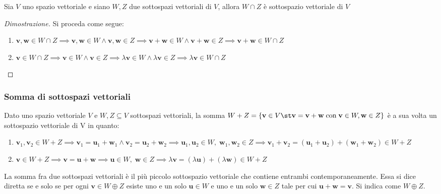     \vspace{10pt}
    \begin{lemma}
       Sia $V$ uno spazio vettoriale e siano $W, Z$ due sottospazi vettoriali di $V$, allora $W \cap Z$ è sottospazio vettoriale di $V$
    \end{lemma}
    \begin{proof}[Dimostrazione]
        Si proceda come segue:
        \begin{enumerate}[label=(\Roman*)]
            \item $\mathbf{v}, \mathbf{w} \in W \cap Z \implies \mathbf{v}, \mathbf{w} \in W \land \mathbf{v}, \mathbf{w} \in Z \implies \mathbf{v} + \mathbf{w} \in W \land \mathbf{v} + \mathbf{w} \in Z \implies \mathbf{v} + \mathbf{w} \in W \cap Z$
            \item $\mathbf{v} \in W \cap Z \implies \mathbf{v} \in W \land \mathbf{v} \in Z \implies \lambda \mathbf{v} \in W \land \lambda \mathbf{v} \in Z \implies \lambda \mathbf{v} \in W \cap Z$
        \end{enumerate}
    \end{proof}

    \subsubsection{Somma di sottospazi vettoriali} \label{subsubsec:vsdirect}
    Dato uno spazio vettoriale $V$ e $W, Z \subseteq V$ sottospazi vettoriali, la somma $W + Z = \{\mathbf{v} \in V \st \mathbf{v} = \mathbf{v} + \mathbf{w} \; \textnormal{con} \; \mathbf{v} \in W, \mathbf{w} \in Z\}$ è a sua volta un sottospazio vettoriale di V in quanto:
    \begin{enumerate}[label=(\arabic*)]
        \item $\mathbf{v}_{1}, \mathbf{v}_{2} \in W + Z \implies \mathbf{v}_{1} = \mathbf{u}_{1} + \mathbf{w}_{1} \land \mathbf{v}_{2} = \mathbf{u}_{2} + \mathbf{w}_{2} \implies \mathbf{u}_{1}, \mathbf{u}_{2} \in W, \; \mathbf{w}_{1}, \mathbf{w}_{2} \in Z \implies \mathbf{v}_{1} + \mathbf{v}_{2} = (\mathbf{u}_{1} + \mathbf{u}_{2}) + (\mathbf{w}_{1} + \mathbf{w}_{2}) \in W + Z$
        \item $\mathbf{v} \in W + Z \implies \mathbf{v} = \mathbf{u} + \mathbf{w} \implies \mathbf{u} \in W, \; \mathbf{w} \in Z \implies \lambda \mathbf{v} = (\lambda \mathbf{u}) + (\lambda \mathbf{w}) \in W + Z$
    \end{enumerate}
    La somma fra due sottospazi vettoriali è il più piccolo sottospazio vettoriale che contiene entrambi contemporaneamente. Essa si dice diretta se e solo se per ogni $\mathbf{v} \in W \oplus Z$ esiste uno e un solo $\mathbf{u} \in W$ e uno e un solo $\mathbf{w} \in Z$ tale per cui
    $\mathbf{u} + \mathbf{w} = \mathbf{v}$. Si indica come $W \oplus Z$.

